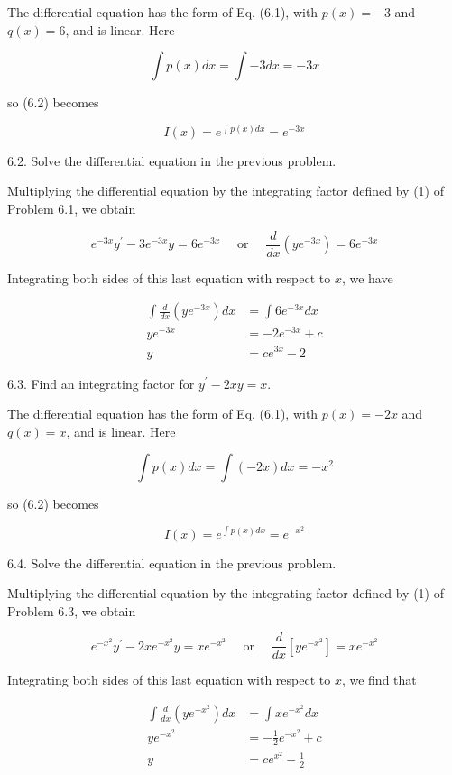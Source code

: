 \documentclass[10pt]{article}
\begin{document}
The differential equation has the form of Eq. (6.1), with $p(x)=-3$ and $q(x)=6$, and is linear. Here

$$
\int p(x) d x=\int-3 d x=-3 x
$$

so (6.2) becomes


\begin{equation*}
I(x)=e^{\int p(x) d x}=e^{-3 x} \tag{1}
\end{equation*}


6.2. Solve the differential equation in the previous problem.

Multiplying the differential equation by the integrating factor defined by (1) of Problem 6.1, we obtain

$$
e^{-3 x} y^{\prime}-3 e^{-3 x} y=6 e^{-3 x} \quad \text { or } \quad \frac{d}{d x}\left(y e^{-3 x}\right)=6 e^{-3 x}
$$

Integrating both sides of this last equation with respect to $x$, we have

$$
\begin{aligned}
\int \frac{d}{d x}\left(y e^{-3 x}\right) d x & =\int 6 e^{-3 x} d x \\
y e^{-3 x} & =-2 e^{-3 x}+c \\
y & =c e^{3 x}-2
\end{aligned}
$$

6.3. Find an integrating factor for $y^{\prime}-2 x y=x$.

The differential equation has the form of Eq. (6.1), with $p(x)=-2 x$ and $q(x)=x$, and is linear. Here

$$
\int p(x) d x=\int(-2 x) d x=-x^{2}
$$

so (6.2) becomes


\begin{equation*}
I(x)=e^{\int p(x) d x}=e^{-x^{2}} \tag{1}
\end{equation*}


6.4. Solve the differential equation in the previous problem.

Multiplying the differential equation by the integrating factor defined by (1) of Problem 6.3, we obtain

$$
e^{-x^{2}} y^{\prime}-2 x e^{-x^{2}} y=x e^{-x^{2}} \quad \text { or } \quad \frac{d}{d x}\left[y e^{-x^{2}}\right]=x e^{-x^{2}}
$$

Integrating both sides of this last equation with respect to $x$, we find that

$$
\begin{aligned}
\int \frac{d}{d x}\left(y e^{-x^{2}}\right) d x & =\int x e^{-x^{2}} d x \\
y e^{-x^{2}} & =-\frac{1}{2} e^{-x^{2}}+c \\
y & =c e^{x^{2}}-\frac{1}{2}
\end{aligned}
$$
\end{document}
